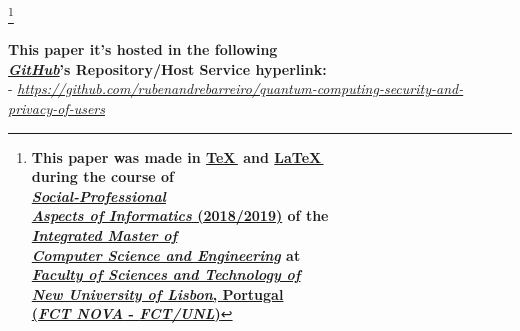 \documentclass[conference]{IEEEtran}
\begin{document}
\begin{center}
    \thanks{
        \small{
            \textbf{This paper was made in \href{http://tug.org/}{\TeX\,} and \href{https://www.latex-project.org/}{\LaTeX\,} \\
            during the course of\\
            \href{https://sites.google.com/campus.fct.unl.pt/aspi-2019}{\textit{Social-Professional\\Aspects of Informatics} (2018/2019)} of the\\
            \href{https://www.fct.unl.pt/en/education/course/integrated-master-computer-science}{\textit{Integrated Master of}\\
            \textit{Computer Science and Engineering}} at\\
            \href{https://www.fct.unl.pt/}{\textit{Faculty of Sciences and Technology of}\\
            \textit{New University of Lisbon}, Portugal\\
            (\textit{FCT NOVA} - \textit{FCT/UNL})}}}
        }
\end{center}

\vspace{4pt}

\begin{center}
    \small{
        \textbf{
            This paper it's hosted in the following \\ \href{https://github.com/}{\textit{GitHub}}'s Repository/Host Service hyperlink:
        }\\
        \vspace{3pt}
        - \href{https://github.com/rubenandrebarreiro/quantum-computing-security-and-privacy-of-users}{\textit{https://github.com/rubenandrebarreiro/quantum-computing-security-and-privacy-of-users}}
    }
\end{center}
\end{document}
